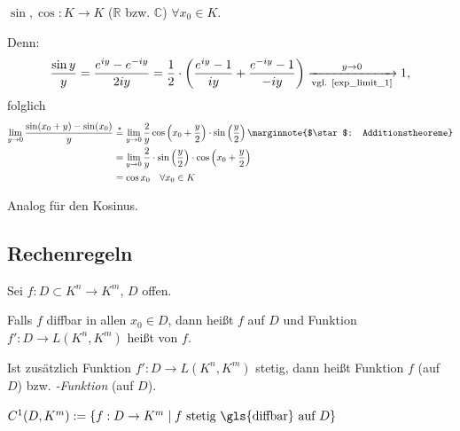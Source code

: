 \begin{example}
	$\sin, \cos: K\to K$ ($\mathbb{R}$ bzw. $\mathbb{C}$) $\forall x_0\in K$.
	
	Denn:{\zeroAmsmathAlignVSpaces
	\begin{align*}
		 \frac{\sin y}{y} = \frac{e^{iy} - e^{-iy}}{2iy} = \frac{1}{2}\cdot \left( \frac{e^{iy} - 1}{iy} + \frac{e^{-iy} - 1}{-iy} \right) \xrightarrow[\text{vgl. \eqref{exp_limit_1}}]{y\to 0} 1,
	\end{align*}}
	folglich {\zeroAmsmathAlignVSpaces*
	\begin{align*}
		\lim\limits_{y\to 0} \frac{\sin(x_0 + y) - \sin(x_0)}{y} &\overset{\star}{=} \lim\limits_{y\to 0} \frac{2}{y} \cos\left( x_0 + \frac{y}{2}\right) \cdot \sin \left( \frac{y}{2}\right) \marginnote{$\star$: Additionstheoreme} \\
		&= \lim\limits_{y\to 0} \frac{2}{y}\cdot\sin\left(\frac{y}{2}\right)\cdot\cos\left(x_0 + \frac{y}{2}\right)\\
		&= \cos x_0 \quad\forall x_0\in K
		\end{align*}}
		
	Analog für den Kosinus.
	
	\begin{center}
		\end{center}
\end{example}

\subsection{Rechenregeln}
\begin{*definition}
	Sei $f:D\subset K^n \to K^m$, $D$ offen.
	
	Falls $f$  \gls{diffbar} in allen $x_0\in D$, dann heißt $f$  auf $D$ und Funktion $f':D\to L(K^n, K^m)$ heißt  von $f$.
	
	Ist zusätzlich Funktion $f': D\to L(K^n, K^m)$ stetig, dann heißt Funktion $f$  (auf $D$) bzw. \emph{-Funktion} (auf $D$).
	
	$C^1(D, K^m):= \left\lbrace f: D\to K^m \mid f \text{ stetig  \gls{diffbar} auf } D \right\rbrace$
\end{*definition}

